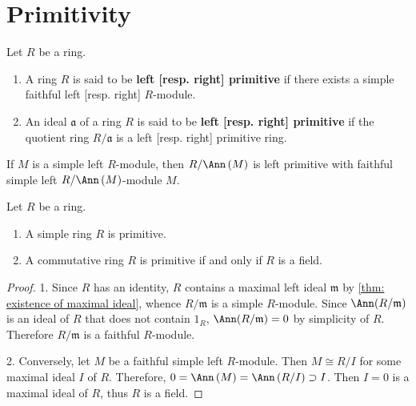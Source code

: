 \section{Primitivity} %
\begin{definition}
    Let $R$ be a ring.
    \begin{enumerate}
        \item
              A ring $R$ is said to be \textbf{left [resp. right] primitive} if there exists a simple faithful left [resp. right] $R$-module.
        \item
              An ideal $\mathfrak{a}$ of a ring $R$ is said to be \textbf{left [resp. right] primitive} if the quotient ring $R / \mathfrak{a}$ is a left [resp. right] primitive ring.
    \end{enumerate}
    \begin{remark}
        If $M$ is a simple left $R$-module, then $R/\Ann\left( M \right)$ is left primitive with faithful simple left $R/\Ann\left( M \right)$-module $M$.
    \end{remark}
\end{definition}


\begin{proposition}
    Let $R$ be a ring.
    \begin{enumerate}
        \item
              A simple ring $R$ is primitive.

        \item
              A commutative ring $R$ is primitive if and only if $R$ is a field.
    \end{enumerate}

    \begin{proof}
        1.
        Since $R$ has an identity, $R$ contains a maximal left ideal $\mathfrak{m}$  by \ref{thm: existence of maximal ideal}, whence $R / \mathfrak{m}$ is a simple $R$-module.
        Since $\Ann(R / \mathfrak{m})$ is an ideal of $R$ that does not contain $1_R$, $\Ann(R / \mathfrak{m})=0$ by simplicity of $R$. Therefore $R /  \mathfrak{m}$ is a faithful $R$-module.

        2.
        Conversely, let $M$ be a faithful simple left $R$-module. Then $M \cong R / I$ for some maximal ideal $I$ of $R$. Therefore, $0=\Ann\left( M \right)=\Ann\left( R/I \right)\supset I$. Then $I=0$ is a maximal ideal of $R$, thus $R$ is a field.
    \end{proof}
\end{proposition}

